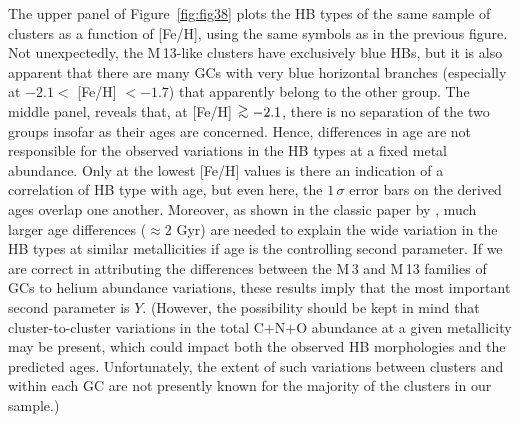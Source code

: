 \documentclass[12pt,preprint]{aastex}
\newcommand\gta{\mathrel{\hbox{\raise 0.6 ex \hbox{$>$}\kern
                   -1.7 ex\lower .5 ex\hbox{$\sim$}}}}
\begin{document}
The upper panel of Figure~\ref{fig:fig38} plots the HB types of the same sample
of clusters as a function of [Fe/H], using the same symbols as in the previous
figure.  Not unexpectedly, the M$\,$13-like clusters have exclusively blue HBs,
but it is also apparent that there are many GCs with very blue horizontal
branches (especially at $-2.1 <$ [Fe/H] $< -1.7$) that apparently belong to
the other group.  The middle panel, reveals that, at [Fe/H] $\gta -2.1$, there
is no separation of the two groups insofar as their ages are concerned.  Hence,
differences in age are not responsible for the observed variations in the HB
types at a fixed metal abundance.  Only at the lowest [Fe/H] values is there an
indication of a correlation of HB type with age, but even here, the $1\,\sigma$
error bars on the derived ages overlap one another.  Moreover, as shown in
the classic paper by \citet{ldz94}, much larger age differences ($\approx 2$
Gyr) are needed to explain the wide variation in the HB types at similar
metallicities if age is the controlling second parameter.  
If we are correct in attributing the differences between the M$\,$3
and M$\,$13 families of GCs to helium abundance variations, these results imply
that the most important second parameter is $Y$.  (However, the possibility
should be kept in mind that cluster-to-cluster variations in the total C$+$N$+$O
abundance at a given metallicity may be present, which could impact both the
observed HB morphologies and the predicted ages.  Unfortunately, the extent of
such variations between clusters and within each GC are not presently known for
the majority of the clusters in our sample.)
\end{document}
